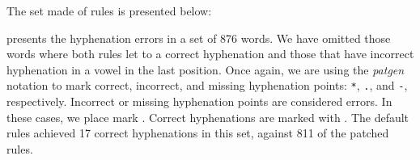 The set made of \NumberOfNewRules{} rules is presented below:
\begin{multicols}{6}
    \footnotesize
    
\end{multicols}

 presents the hyphenation errors in a set of 876 words.
We have omitted those words where both rules let to a correct hyphenation and
those that have incorrect hyphenation in a vowel in the last position. 
Once again, we are using the \emph{patgen} notation to mark correct, incorrect,
and missing hyphenation points: \texttt{*}, \texttt{.}, and \texttt{-}, respectively.
Incorrect or missing hyphenation points are considered errors. In these cases,
we place mark \xmark. Correct hyphenations are marked with \cmark.
The default rules achieved 17 correct hyphenations in this set, against 811 
of the patched rules.



